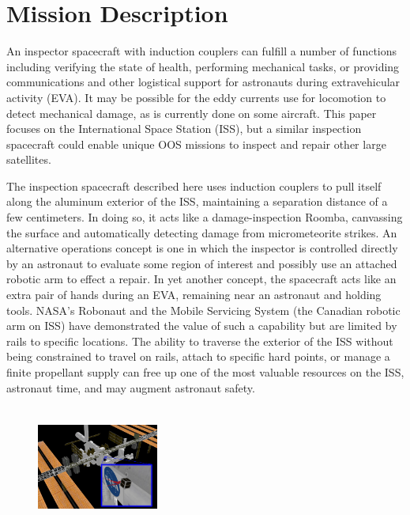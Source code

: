 \section{Mission Description}

An inspector spacecraft with induction couplers can fulfill a number of functions including verifying the state of health, performing mechanical tasks, or providing communications and other logistical support for astronauts during extravehicular activity (EVA). It may be possible for the eddy currents use for locomotion to detect mechanical damage, as is currently done on some aircraft. \cite{Yang2010}
 This paper focuses on the International Space Station (ISS), but a similar inspection spacecraft could enable unique OOS missions to inspect and repair other large satellites.

The inspection spacecraft described here uses induction couplers to pull itself along the aluminum exterior of the ISS, maintaining a separation distance of a few centimeters. In doing so, it acts like a damage-inspection Roomba,\cite{Tribelhorn2007}
 canvassing the surface and automatically detecting damage from micrometeorite strikes. An alternative operations concept is one in which the inspector is controlled directly by an astronaut to evaluate some region of interest and possibly use an attached robotic arm to effect a repair. In yet another concept, the spacecraft acts like an extra pair of hands during an EVA, remaining near an astronaut and holding tools. NASA’s Robonaut and the Mobile Servicing System (the Canadian robotic arm on ISS) have demonstrated the value of such a capability but are limited by rails to specific locations. \cite{Ambrose2012}
The ability to traverse the exterior of the ISS without being constrained to travel on rails, attach to specific hard points, or manage a finite propellant supply can free up one of the most valuable resources on the ISS, astronaut time, and may augment astronaut safety.

\begin{figure}
\includegraphics[width = 4cm, height = 4cm ]{figures/iss_inspector.jpg}
\label{fig:iss_inspector}
\end{figure}